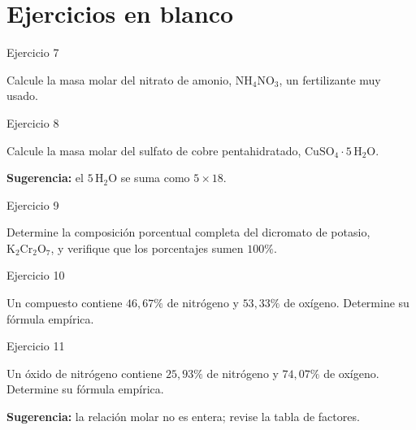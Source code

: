 \documentclass[aspectratio=169]{beamer}
\newcommand{\pc}{\text{\%}}
\begin{document}
\section{Ejercicios en blanco}

\begin{frame}{Ejercicio 7}
  \begin{mwejercicio}
    Calcule la masa molar del nitrato de amonio, $\text{NH}_4\text{NO}_3$,
    un fertilizante muy usado.
  \end{mwejercicio}
\end{frame}

\begin{frame}{Ejercicio 8}
  \begin{mwejercicio}
    Calcule la masa molar del sulfato de cobre pentahidratado,
    $\text{CuSO}_4\cdot5\,\text{H}_2\text{O}$.
    \par\smallskip
    \small
    \textbf{Sugerencia:} el $5\,\text{H}_2\text{O}$ se suma como $5\times18$.
  \end{mwejercicio}
\end{frame}

\begin{frame}{Ejercicio 9}
  \begin{mwejercicio}
    Determine la composición porcentual completa del dicromato de potasio,
    $\text{K}_2\text{Cr}_2\text{O}_7$, y verifique que los porcentajes sumen $100\pc$.
  \end{mwejercicio}
\end{frame}

\begin{frame}{Ejercicio 10}
  \begin{mwejercicio}
    Un compuesto contiene $46{,}67\pc$ de nitrógeno y $53{,}33\pc$ de oxígeno.
    Determine su fórmula empírica.
  \end{mwejercicio}
\end{frame}

\begin{frame}{Ejercicio 11}
  \begin{mwejercicio}
    Un óxido de nitrógeno contiene $25{,}93\pc$ de nitrógeno y $74{,}07\pc$ de
    oxígeno. Determine su fórmula empírica.
    \par\smallskip
    \small
    \textbf{Sugerencia:} la relación molar no es entera; revise la tabla de factores.
  \end{mwejercicio}
\end{frame}
\end{document}

